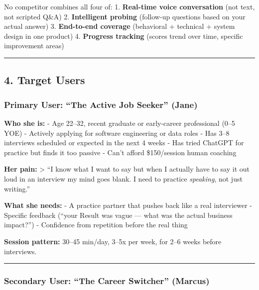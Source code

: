\documentclass[
  11pt,
]{article}
\begin{document}
No competitor combines all four of: 1. \textbf{Real-time voice
conversation} (not text, not scripted Q\&A) 2. \textbf{Intelligent
probing} (follow-up questions based on your actual answer) 3.
\textbf{End-to-end coverage} (behavioral + technical + system design in
one product) 4. \textbf{Progress tracking} (scores trend over time,
specific improvement areas)

\begin{center}\rule{0.5\linewidth}{0.5pt}\end{center}

\hypertarget{target-users}{%
\subsection{4. Target Users}\label{target-users}}

\hypertarget{primary-user-the-active-job-seeker-jane}{%
\subsubsection{Primary User: ``The Active Job Seeker''
(Jane)}\label{primary-user-the-active-job-seeker-jane}}

\textbf{Who she is:} - Age 22--32, recent graduate or early-career
professional (0--5 YOE) - Actively applying for software engineering or
data roles - Has 3--8 interviews scheduled or expected in the next 4
weeks - Has tried ChatGPT for practice but finds it too passive - Can't
afford \$150/session human coaching

\textbf{Her pain:} \textgreater{} ``I know what I want to say but when I
actually have to say it out loud in an interview my mind goes blank. I
need to practice \emph{speaking}, not just writing.''

\textbf{What she needs:} - A practice partner that pushes back like a
real interviewer - Specific feedback (``your Result was vague --- what
was the actual business impact?'') - Confidence from repetition before
the real thing

\textbf{Session pattern:} 30--45 min/day, 3--5x per week, for 2--6 weeks
before interviews.

\begin{center}\rule{0.5\linewidth}{0.5pt}\end{center}

\hypertarget{secondary-user-the-career-switcher-marcus}{%
\subsubsection{Secondary User: ``The Career Switcher''
(Marcus)}\label{secondary-user-the-career-switcher-marcus}}
\end{document}
